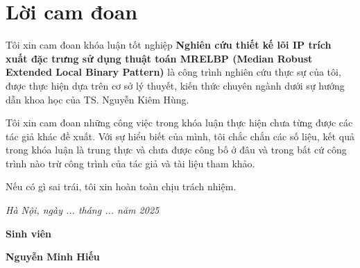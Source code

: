 \clearpage
{}

\chapter*{Lời cam đoan}

Tôi xin cam đoan khóa luận tốt nghiệp \textbf{Nghiên cứu thiết kế lõi IP trích xuất đặc trưng sử dụng thuật toán MRELBP (Median Robust Extended Local Binary Pattern)} là công trình nghiên cứu thực sự của tôi, được thực hiện dựa trên cơ sở lý thuyết, kiến thức chuyên ngành dưới sự hướng dẫn khoa học của TS. Nguyễn Kiêm Hùng.

Tôi xin cam đoan những công việc trong khóa luận thực hiện chưa từng được các tác giả khác đề xuất. Với sự hiểu biết của mình, tôi chắc chắn các số liệu, kết quả trong khóa luận là trung thực và chưa được công bố ở đâu và trong bất cứ công trình nào trừ công trình của tác giả và tài liệu tham khảo.

Nếu có gì sai trái, tôi xin hoàn toàn chịu trách nhiệm.

\vspace{1cm}
\hspace{7cm}\textit{Hà Nội, ngày ... tháng ... năm 2025}

\hspace{9.4cm}\textbf{Sinh viên}
\vspace{2.5cm}


\hspace{8.8cm}\textbf{Nguyễn Minh Hiếu}

